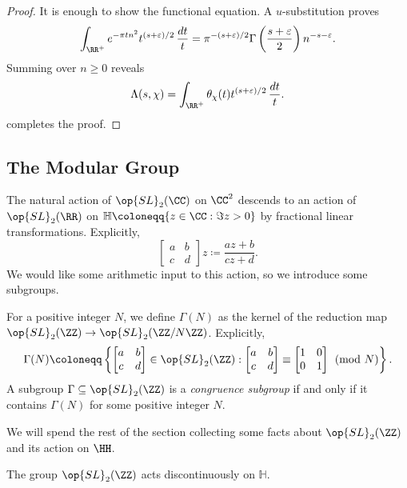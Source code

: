 \documentclass{article}
\begin{document}
\begin{proof}
	It is enough to show the functional equation. A $u$-substitution proves
	\[\int_{\RR^+}e^{-\pi tn^2}t^{(s+\varepsilon)/2}\,\frac{dt}t=\pi^{-(s+\varepsilon)/2}\Gamma\left(\frac{s+\varepsilon}2\right)n^{-s-\varepsilon}.\]
	Summing over $n\ge0$ reveals
	\[\Lambda(s,\chi)=\int_{\RR^+}\theta_\chi(t)t^{(s+\varepsilon)/2}\,\frac{dt}t.\]
	 completes the proof.
\end{proof}

\subsection{The Modular Group}
The natural action of $\op{SL}_2(\CC)$ on $\CC^2$ descends to an action of $\op{SL}_2(\RR)$ on $\mathbb H\coloneqq\{z\in\CC:\Im z>0\}$ by fractional linear transformations. Explicitly,
\[\begin{bmatrix}
	a & b \\ c & d
\end{bmatrix}z\coloneqq\frac{az+b}{cz+d}.\]
We would like some arithmetic input to this action, so we introduce some subgroups.
\begin{definition}
	For a positive integer $N$, we define $\Gamma(N)$ as the kernel of the reduction map $\op{SL}_2(\ZZ)\to\op{SL}_2(\ZZ/N\ZZ)$. Explicitly,
	\[\Gamma(N)\coloneqq\left\{\begin{bmatrix}
		a & b \\ c & d
	\end{bmatrix}\in\op{SL}_2(\ZZ):\begin{bmatrix}
		a & b \\ c & d
	\end{bmatrix}\equiv\begin{bmatrix}
		1 & 0 \\ 0 & 1
	\end{bmatrix}\pmod N\right\}.\]
	A subgroup $\Gamma\subseteq\op{SL}_2(\ZZ)$ is a \textit{congruence subgroup} if and only if it contains $\Gamma(N)$ for some positive integer $N$.
\end{definition}
We will spend the rest of the section collecting some facts about $\op{SL}_2(\ZZ)$ and its action on $\HH$.
\begin{proposition}
	The group $\op{SL}_2(\ZZ)$ acts discontinuously on $\mathbb H$.
\end{proposition}
\end{document}
